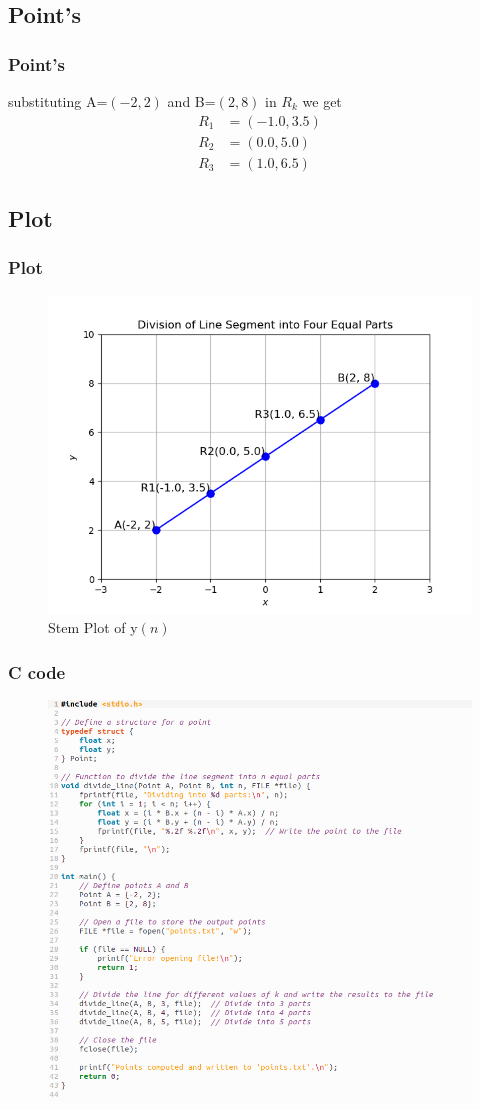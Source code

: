\documentclass{beamer}
\providecommand{\brak}[1]{\ensuremath{\left(#1\right)}}
\theoremstyle{remark}
\numberwithin{equation}{section}
\begin{document}
\subsection{Point's}
\begin{frame}
\frametitle{Point's}
substituting A=\brak{-2,2} and B=\brak{2,8} in $R_k$
we get \\
\begin{align}
   R_1&=\brak{-1.0,3.5}\\
   R_2&=\brak{0.0,5.0}\\
   R_3&=\brak{1.0,6.5}
\end{align}	
\end{frame}
\subsection{Plot}
\begin{frame}
\frametitle{Plot}
\begin{figure}
    \centering
    \includegraphics[width=0.5\linewidth]{figs/Figure_1.png}
    \caption{Stem Plot of y\brak{n}}
    \label{stemplot}
\end{figure}	
\end{frame}
\begin{frame}
\frametitle{C code}
\begin{figure}
    \centering
    \includegraphics[width=0.5\linewidth]{figs/Figure_3.png}
   
\end{figure}	
\end{frame}
\end{document}
